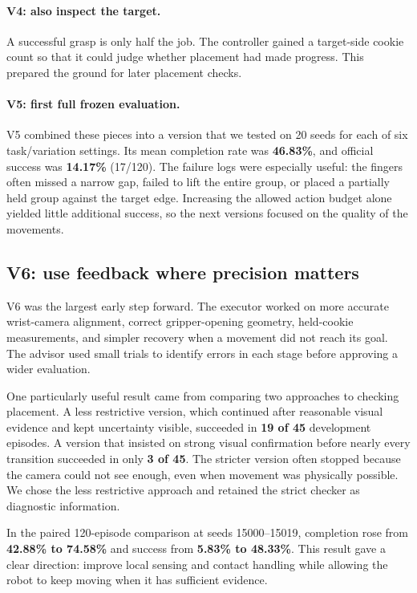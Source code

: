 \paragraph{V4: also inspect the target.}
A successful grasp is only half the job. The controller gained a target-side cookie count so that it could judge whether placement had made progress. This prepared the ground for later placement checks.

\paragraph{V5: first full frozen evaluation.}
V5 combined these pieces into a version that we tested on 20 seeds for each of six task/variation settings. Its mean completion rate was \textbf{46.83\%}, and official success was \textbf{14.17\%} (17/120). The failure logs were especially useful: the fingers often missed a narrow gap, failed to lift the entire group, or placed a partially held group against the target edge. Increasing the allowed action budget alone yielded little additional success, so the next versions focused on the quality of the movements.

\subsection{V6: use feedback where precision matters}
V6 was the largest early step forward. The executor worked on more accurate wrist-camera alignment, correct gripper-opening geometry, held-cookie measurements, and simpler recovery when a movement did not reach its goal. The advisor used small trials to identify errors in each stage before approving a wider evaluation.

One particularly useful result came from comparing two approaches to checking placement. A less restrictive version, which continued after reasonable visual evidence and kept uncertainty visible, succeeded in \textbf{19 of 45} development episodes. A version that insisted on strong visual confirmation before nearly every transition succeeded in only \textbf{3 of 45}. The stricter version often stopped because the camera could not see enough, even when movement was physically possible. We chose the less restrictive approach and retained the strict checker as diagnostic information.

In the paired 120-episode comparison at seeds 15000--15019, completion rose from \textbf{42.88\% to 74.58\%} and success from \textbf{5.83\% to 48.33\%}. This result gave a clear direction: improve local sensing and contact handling while allowing the robot to keep moving when it has sufficient evidence.

